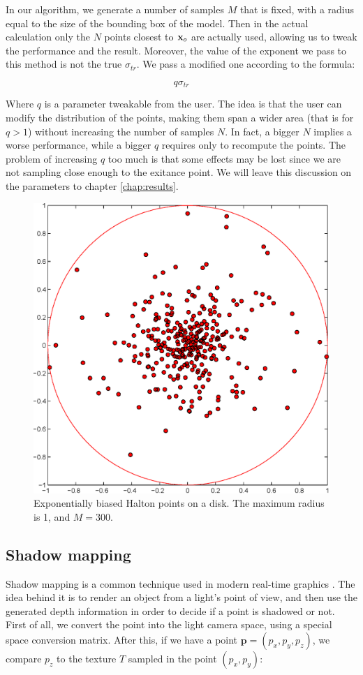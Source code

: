 In our algorithm, we generate a number of samples $M$ that is fixed, with a radius equal to the size of the bounding box of the model. Then in the actual calculation only the $N$ points closest to $\mathbf{x}_o$ are actually used, allowing us to tweak the performance and the result. Moreover, the value of the exponent we pass to this method is not the true $\sigma_{tr}$. We pass a modified one according to the formula:

$$
q \sigma_{tr}
$$

Where $q$ is a parameter tweakable from the user. The idea is that the user can modify the distribution of the points, making them span a wider area (that is for $q > 1$) without increasing the number of samples $N$. In fact, a bigger $N$ implies a worse performance, while a bigger $q$ requires only to recompute the points. The problem of increasing $q$ too much is that some effects may be lost since we are not sampling close enough to the exitance point. We will leave this discussion on the parameters to chapter \ref{chap:results}. 

\begin{figure}[!ht]
\centering
\includegraphics[width=0.7\linewidth]{images/matlab/halton_exp.eps}
\caption{Exponentially biased Halton points on a disk. The maximum radius is 1, and $M = 300$.}
\label{fig:hp}
\end{figure} 

\subsection{Shadow mapping}
\label{sec:shadow_map}
Shadow mapping is a common technique used in modern real-time graphics \citep{everitt,Segal:1992:FSL:142920.134071,williams1978a}. The idea behind it is to render an object from a light's point of view, and then use the generated depth information in order to decide if a point is shadowed or not. First of all, we convert the point into the light camera space, using a special space conversion matrix. After this, if we have a point $\mathbf{p} = (p_x,p_y,p_z)$, we compare $p_z$ to the texture $T$ sampled in the point $(p_x,p_y)$:

